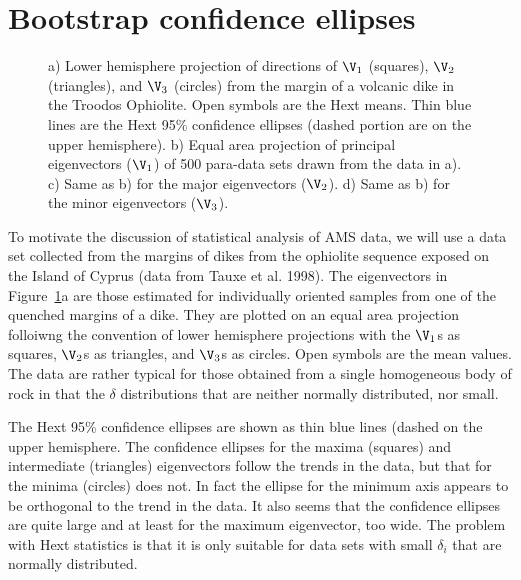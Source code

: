\section {Bootstrap confidence ellipses}



\begin{figure} [htb]
\epsfxsize 15cm
\centering {}%
\caption{
a) Lower hemisphere projection of directions of
 $\V_1$ (squares), $\V_2$ (triangles), and $\V_3$ (circles) from the 
margin of a volcanic dike in the Troodos Ophiolite.   Open symbols are the Hext means.  Thin blue lines are the Hext 95\% confidence ellipses (dashed portion are on the upper hemisphere).  
b) Equal area projection of  principal eigenvectors 
($\V_1$)  of 500 para-data sets drawn from the data in a). c) Same as b) for the 
major eigenvectors  ($\V_2$).
d) Same as b) for the minor eigenvectors ($\V_3$).  }
\label{fig:evec}
\end{figure}

To motivate the discussion of statistical analysis of AMS data, we will use a data set collected from the margins of dikes from the ophiolite sequence exposed on the Island of Cyprus (data from 
Tauxe et al. 1998).
\nocite{tauxe98b} 
The eigenvectors  in Figure~\ref{fig:evec}a  are those estimated for individually oriented samples from one of the quenched margins of a dike.  They are plotted on an equal area projection folloiwng the convention of 
lower hemisphere projections with the $\V_1$s as squares, $\V_2$s as triangles,
and $\V_3$s as circles. Open symbols are the mean values.  
The data are rather typical for those obtained  from a single 
homogeneous body of rock  in that the  $\delta$ distributions that are neither 
normally distributed, nor
small.  

The Hext 95\% confidence ellipses are shown as thin blue lines (dashed on the upper hemisphere.    The confidence ellipses for the maxima (squares) and intermediate (triangles) eigenvectors follow the trends in the data, but that for the minima (circles) does not.  In fact the ellipse for the minimum axis appears to be orthogonal to the trend in the data.   It also seems that the confidence ellipses are quite large and at least for the maximum eigenvector, too wide.      The problem with Hext statistics is that it is only suitable for data sets with small $\delta_i$ that are normally distributed.  


